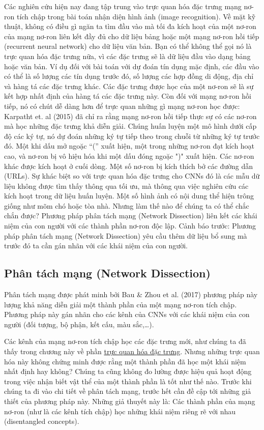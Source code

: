 Các nghiên cứu hiện nay đang tập trung vào trực quan hóa đặc trưng mạng nơ-ron tích chập trong bài toán nhận diện hình ảnh (image recognition). Về mặt kỹ thuật, không có điều gì ngăn ta tìm đầu vào mà tối đa kích hoạt của một nơ-ron của mạng nơ-ron liên kết đầy đủ cho dữ liệu bảng hoặc một mạng nơ-ron hồi tiếp (recurrent neural network) cho dữ liệu văn bản. Bạn có thể không thể gọi nó là trực quan hóa đặc trưng nữa, vì các đặc trưng sẽ là dữ liệu đầu vào dạng bảng hoặc văn bản. Ví dụ đối với bài toán với dự đoán tín dụng mặc định, các đầu vào có thể là số lượng các tín dụng trước đó, số lượng các hợp đồng di động, địa chỉ và hàng tá các đặc trưng khác. Các đặc trưng được học của một nơ-ron sẽ là sự kết hợp nhất định của hàng tá các đặc trưng này. Còn đối với mạng nơ-ron hồi tiếp, nó có chút dễ dàng hơn để trực quan những gì mạng nơ-ron học được: Karpatht et. al (2015) đã chỉ ra rằng mạng nơ-ron hồi tiếp thực sự có các nơ-ron mà học những đặc trưng khả diễn giải. Chúng huấn luyện một mô hình dưới cấp độ các ký tự, nó dự đoán những ký tự tiếp theo trong chuỗi từ những ký tự trước đó. Một khi dấu mở ngoặc “(” xuất hiện, một trong những nơ-ron đạt kích hoạt cao, và nơ-ron bị vô hiệu hóa khi một dấu đóng ngoặc ")" xuất hiện. Các nơ-ron khác
được kích hoạt ở cuối dòng. Một số nơ-ron bị kích thích bở các đường dẫn (URLs). Sự khác biệt so với trực quan hóa đặc trưng cho CNNs đó là các mẫu dữ liệu không được tìm thấy thông qua tối ưu, mà thông qua việc nghiên cứu các kích hoạt trong dữ liệu huấn luyện.
Một số hình ảnh có nội dung thể hiện trông giống như mõm chó hoặc tòa nhà. Nhưng làm thế nào để chúng ta có thể chắc chắn được? Phương pháp phân tách mạng (Network Dissection) liên kết các khái niệm của con người với các thành phần nơ-ron độc lập. Cảnh báo trước: Phương pháp phân tách mạng (Network Dissection) yêu cầu thêm dữ liệu bổ sung mà trước đó ta cần gán nhãn với các khái niệm của con người.

\subsection{Phân tách mạng (Network Dissection)}

Phân tách mạng được phát minh bởi Bau \& Zhou et al. (2017) phương pháp này lượng khả năng diễn giải một thành phần của một mạng nơ-ron tích chập. Phương pháp này gán nhãn cho các kênh của CNNs với các khái niệm của con người (đối tượng, bộ phận, kết cấu, màu sắc,…).

Các kênh của mạng nơ-ron tích chập học các đặc trưng mới, như chúng ta đã thấy trong chương này về phần  \href{https://christophm.github.io/interpretable-ml-book/cnn-features.html#feature-visualization}{trực quan hóa đặc trưng}. Nhưng những trực quan hóa này không chứng minh được rằng một thành phần đã học một khái niệm nhất định hay không? Chúng ta cũng không đo lường được hiệu quả hoạt động trong việc nhận biết vật thể của một thành phần là tốt như thế nào. Trước khi chúng ta đi vào chi tiết về phân tách mạng, trước hết cần đề cập tới những giả thiết của phương pháp này. Những giả thuyết này là: Các thành phần của mạng nơ-ron (như là các kênh tích chập) học những khái niệm riêng rẽ với nhau (disentangled concepts). 

